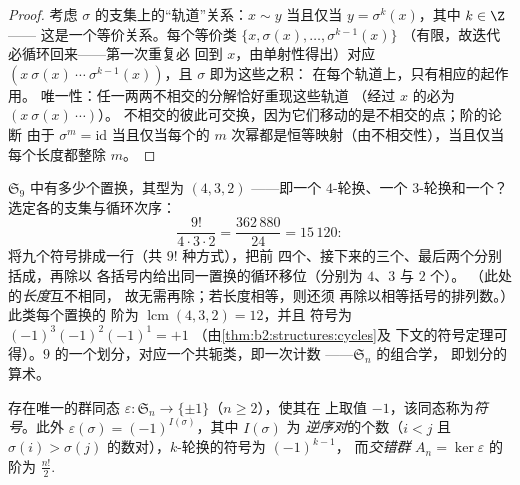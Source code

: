 \begin{proof}
考虑 $\sigma$ 的支集上的“轨道”关系：$x \sim y$
当且仅当 $y = \sigma^k(x)$，其中 $k \in \Z$——
这是一个等价关系。每个等价类 $\{x, \sigma(x), \dots, \sigma^{k-1}(x)\}$
（有限，故迭代必循环回来——第一次重复必
回到 $x$，由单射性得出）对应 $(x\ \sigma(x)\
\cdots\ \sigma^{k-1}(x))$，且 $\sigma$ 即为这些之积：
在每个轨道上，只有相应的起作用。
唯一性：任一两两不相交的分解恰好重现这些轨道
（经过 $x$ 的必为 $(x\ \sigma(x)\ \cdots)$）。
不相交的彼此可交换，因为它们移动的是不相交的点；阶的论断
由于 $\sigma^m = \mathrm{id}$ 当且仅当每个\omterm{def:b2:structures:sn}{轮换}的
$m$ 次幂都是恒等映射（由不相交性），当且仅当每个长度都整除 $m$。
\end{proof}

\begin{example}[轮换型的计数]\label{ex:b2:structures:cycletype}
$\mathfrak{S}_9$ 中有多少个置换，其型为
$(4, 3, 2)$ ——即一个 $4$-轮换、一个 $3$-轮换和一个？
选定各\omterm{def:b2:structures:sn}{轮换}的支集与循环次序：
\[
\frac{9!}{4\cdot 3\cdot 2}
= \frac{362\,880}{24} = 15\,120 :
\]
将九个符号排成一行（共 $9!$ 种方式），把前
四个、接下来的三个、最后两个分别括成，再除以
各括号内给出同一置换的循环移位（分别为 $4$、$3$ 与 $2$ 个）。
（此处的\emph{长度}互不相同，
故无需再除；若长度相等，则还须
再除以相等括号的排列数。）此类每个置换的
阶为 $\operatorname{lcm}(4,3,2) = 12$，并且
符号为 $(-1)^3(-1)^2(-1)^1 = +1$
（由\cref{thm:b2:structures:cycles}及
下文的符号定理可得）。$9$ 的一个划分，对应一个共轭类，即一次计数
——$\mathfrak{S}_n$ 的组合学，
即划分的算术。
\end{example}

\begin{theorem}[符号]\label{thm:b2:structures:signature}
存在唯一的群同态 $\varepsilon \colon
\mathfrak{S}_n \to \{\pm 1\}$（$n \geq 2$），使其在
上取值 $-1$，该同态称为\emph{符号}。此外
$\varepsilon(\sigma) = (-1)^{I(\sigma)}$，其中 $I(\sigma)$ 为
\emph{逆序对}的个数（$i < j$ 且 $\sigma(i) >
\sigma(j)$ 的数对），$k$-轮换的符号为 $(-1)^{k-1}$，
而\emph{交错群} $A_n = \ker\varepsilon$ 的阶为
$\frac{n!}{2}$.
\end{theorem}

